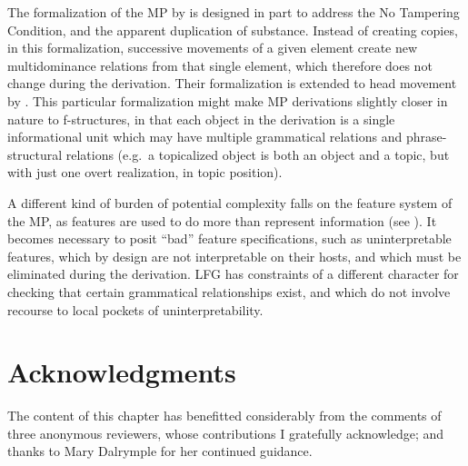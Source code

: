 \documentclass[output=paper,hidelinks]{langscibook}
\begin{document}
The formalization of the MP by \citet{collstab16} is designed in part
to address the No Tampering Condition, and the apparent duplication of
substance. Instead of creating copies, in this formalization,
successive movements of a given element create new multidominance
relations from that single element, which therefore does not change
during the derivation. Their formalization is extended to head
movement by \citet{bleaman21}. This particular formalization might
make MP derivations slightly closer in nature to f-structures, in that
each object in the derivation is a single informational unit which may
have multiple grammatical relations and phrase-structural relations
(e.g.\ a topicalized object is both an object and a topic, but with
just one overt realization, in topic position).

A different kind of burden of potential complexity falls on the
feature system of the MP, as features are used to do more than
represent information (see ). It becomes
necessary to posit ``bad'' feature specifications, such as
uninterpretable features, which by design are not interpretable on
their hosts, and which must be eliminated during the derivation. LFG
has constraints of a different character for checking that certain
grammatical relationships exist, and which do not involve recourse to
local pockets of uninterpretability.

\largerpage
\section*{Acknowledgments}

The content of this chapter has benefitted considerably
  from the comments of three anonymous reviewers, whose contributions
  I gratefully acknowledge; and thanks to Mary Dalrymple for her
  continued guidance.

\sloppy
\printbibliography[heading=subbibliography,notkeyword=this]
\end{document}
